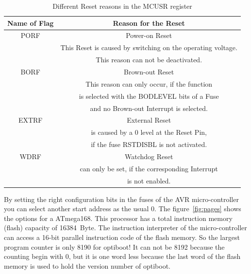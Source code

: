 \begin{table}[H]
  \begin{center}
    \begin{tabular}{| c | c |}
    \hline
              Name of Flag & Reason for the Reset \\
    \hline
    \hline
              PORF & Power-on Reset \\
                   & This Reset is caused by switching on the operating voltage.\\
                   & This reason can not be deactivated.\\
    \hline
              BORF & Brown-out Reset \\
                   & This reason can only occur, if the function \\
                   & is selected with the BODLEVEL bits of a Fuse \\
                   & and no Brown-out Interrupt is selected.\\
    \hline
              EXTRF & External Reset \\
                    & is caused by a 0 level at the Reset Pin, \\
                    & if the fuse  RSTDISBL is not activated. \\
    \hline
              WDRF & Watchdog Reset \\
		   & can only be set, if the corresponding Interrupt \\
		   & is not enabled. \\
    \hline
    \end{tabular}
  \end{center}
  \caption{Different Reset reasons in the MCUSR register}
  \label{tab:resets}
\end{table}

By setting the right configuration bits in the fuses of the AVR micro-controller
you can select another start address as the  usual 0.
The figure~\ref{fig:pages} shows the options for a ATmega168.
This processor has a total instruction memory (flash) capacity of 16384~Byte.
The instruction interpreter of the micro-controller can access a 16-bit
parallel instruction code of the flash memory.
So the largest program counter is only 8190 for optiboot!
It can not be 8192 because the counting begin with 0,
but it is one word less because the last word of the
flash memory is used to hold the version number of optiboot.

